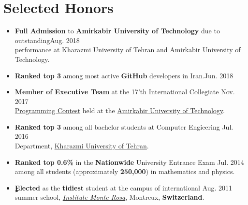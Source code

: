\documentclass[letterpaper,11pt]{article}
\newcommand{\resumeSubHeadingListStart}{\begin{itemize}[leftmargin=*]}
\newcommand{\resumeSubHeadingListEnd}{\end{itemize}}
\begin{document}

\section{Selected Honors}
 \resumeSubHeadingListStart
 \vspace{0.1cm}
  \item{
  	\textbf{Full Admission} to 
  	\textbf{Amirkabir University of Technology}
  	due to outstanding\hfill {Aug. 2018}\\ performance at Kharazmi University of Tehran and Amirkabir University of Technology.
  }
 
 \item{
	\textbf{Ranked top 3} among most active \textbf{GitHub} developers in Iran.\hfill{Jun. 2018}
 }
 \item{
	\textbf{Member of Executive Team}
	at the 17'th \href{https://icpc.baylor.edu/regionals/finder/tehran-2017}{International Collegiate} \hfill {Nov. 2017}\\  \href{https://icpc.baylor.edu/regionals/finder/tehran-2017}{Programming Contest} held at the \href{http://ceit.aut.ac.ir}{Amirkabir University of Technology}.

 }
 
 \item{
	\textbf{Ranked top 3}
	among all bachelor students at Computer Engieering \hfill {Jul. 2016}\\ Department, \href{http://khu.ac.ir}{Kharazmi University of Tehran}.
 }
 
 \item{
 	\textbf{Ranked top 0.6\%}
 	in the \textbf{Nationwide} University Entrance Exam \hfill {Jul. 2014}\\ among all students (approximately \textbf{250,000}) in 
 	mathematics and physics.
 		
 }
 
 \item{
	\textbf{ٍElected}
	as the \textbf{tidiest} student at the campus of international \hfill {Aug. 2011}\\ summer school, \textit{\href{https://www.monterosa.ch/}{Institute Monte Rosa}}, Montreux, \textbf{Switzerland}. 
 	
 }
 \resumeSubHeadingListEnd
	
\end{document}
